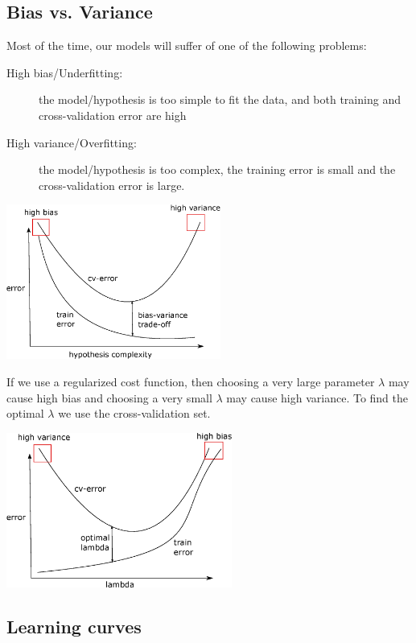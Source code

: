 \documentclass[a4paper,11pt]{report}
\begin{document}
\subsection*{Bias vs. Variance}

Most of the time, our models will suffer of one of the following problems:
\begin{description}
  \item[High bias/Underfitting:] the model/hypothesis is too simple to fit the data, and both training and cross-validation error are high
  \item[High variance/Overfitting:] the model/hypothesis is too complex, the training error is small and the cross-validation error is large.
\end{description}

\begin{center}
\includegraphics[height = 2in]{Images/bias_variance}
\end{center}

If we use a regularized cost function, then choosing a very large parameter $\lambda$ may cause high bias and choosing a very small $\lambda$ may cause high variance. To find the optimal $\lambda$ we use the cross-validation set.

\begin{center}
\includegraphics[height = 2in]{Images/bias_variance_lambda}
\end{center}

\subsection*{Learning curves}
\end{document}
